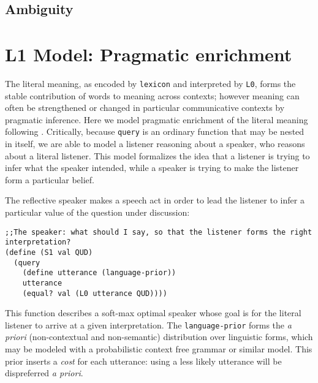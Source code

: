 \documentclass[12pt]{article}
\begin{document}
\subsection{Ambiguity}

  
\section{L1 Model: Pragmatic enrichment}
The literal meaning, as encoded by \lstinline{lexicon} and interpreted by \lstinline{L0}, forms the stable contribution of words to meaning across contexts; however meaning can often be strengthened or changed in particular communicative contexts by pragmatic inference.
Here we model pragmatic enrichment of the literal meaning following \cite{Frank2012,Goodman2013,stuhlmuller2012dynamic}. 
Critically, because \lstinline{query} is an ordinary function that may be nested in itself, we are able to model a listener reasoning about a speaker, who reasons about a literal listener. This model formalizes the idea that a listener is trying to infer what the speaker intended, while a speaker is trying to make the listener form a particular belief. 

The reflective speaker makes a speech act in order to lead the listener to infer a particular value of the question under discussion:
\begin{lstlisting}
;;The speaker: what should I say, so that the listener forms the right interpretation?
(define (S1 val QUD)
  (query
    (define utterance (language-prior))
    utterance
    (equal? val (L0 utterance QUD))))
\end{lstlisting}
This function describes a soft-max optimal speaker 
%
%
whose goal is for the literal listener to arrive at a given interpretation. 
The \lstinline{language-prior} forms the \emph{a priori} (non-contextual and non-semantic) distribution over linguistic forms, which may be modeled with a probabilistic context free grammar or similar model. 
This prior inserts a \emph{cost} for each utterance: using a less likely utterance will be dispreferred \emph{a priori}.
\end{document}
